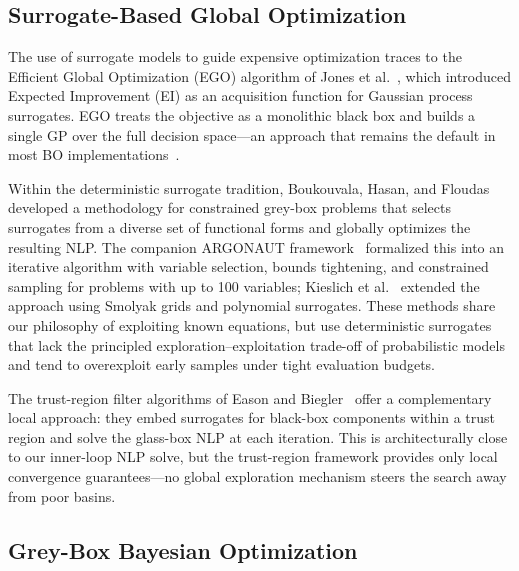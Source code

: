 \documentclass[12pt,a4paper]{article}%
\theoremstyle{plain}%
\theoremstyle{remark}%
\theoremstyle{definition}%
\begin{document}
\subsection{Surrogate-Based Global Optimization}

The use of surrogate models to guide expensive optimization traces to the Efficient Global Optimization (EGO) algorithm of Jones et al.~\cite{jones1998efficient}, which introduced Expected Improvement (EI) as an acquisition function for Gaussian process surrogates. EGO treats the objective as a monolithic black box and builds a single GP over the full decision space---an approach that remains the default in most BO implementations~\cite{shahriari2016bo_survey,frazier2018tutorial}.

Within the deterministic surrogate tradition, Boukouvala, Hasan, and Floudas~\cite{boukouvala2017greybox_jgo} developed a methodology for constrained grey-box problems that selects surrogates from a diverse set of functional forms and globally optimizes the resulting NLP. The companion ARGONAUT framework~\cite{boukouvala2017argonaut} formalized this into an iterative algorithm with variable selection, bounds tightening, and constrained sampling for problems with up to 100 variables; Kieslich et al.~\cite{kieslich2018smolyak} extended the approach using Smolyak grids and polynomial surrogates. These methods share our philosophy of exploiting known equations, but use deterministic surrogates that lack the principled exploration--exploitation trade-off of probabilistic models and tend to overexploit early samples under tight evaluation budgets.

The trust-region filter algorithms of Eason and Biegler~\cite{eason2016trf,eason2018trf} offer a complementary local approach: they embed surrogates for black-box components within a trust region and solve the glass-box NLP at each iteration. This is architecturally close to our inner-loop NLP solve, but the trust-region framework provides only local convergence guarantees---no global exploration mechanism steers the search away from poor basins.

\subsection{Grey-Box Bayesian Optimization}
\end{document}

